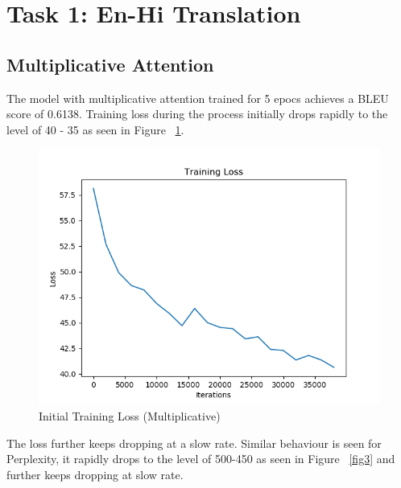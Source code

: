 \documentclass[11pt,a4paper]{article}
\begin{document}
\section{Task 1: En-Hi Translation}


\subsection{Multiplicative Attention}
The model with multiplicative attention trained for 5 epocs achieves a BLEU score of 0.6138.
Training loss during the process initially drops rapidly to the level of 40 - 35 as seen in Figure ~\ref{fig1}. 

\begin{figure}[!htbp]
\includegraphics[width=\linewidth]{hi_mul_loss_1.png}
\caption{Initial Training Loss (Multiplicative)}
\label{fig1}
\end{figure}

The loss further keeps dropping at a slow rate. Similar behaviour is seen for Perplexity, it rapidly drops to the level of 500-450 as seen in Figure ~\ref{fig3} and further keeps dropping at slow rate.

\end{document}
